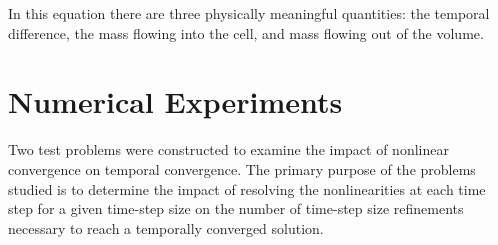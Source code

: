 In this equation there are three physically meaningful quantities: the temporal difference, the mass flowing into the cell, and mass flowing out of the volume.

\section{Numerical Experiments}
\label{sect:numerical_experiments}

Two test problems were constructed to examine the impact of nonlinear convergence on temporal convergence.
The primary purpose of the problems studied is to determine the impact of resolving the nonlinearities at each time step for a given time-step size on the number of time-step size refinements necessary to reach a temporally converged solution.

